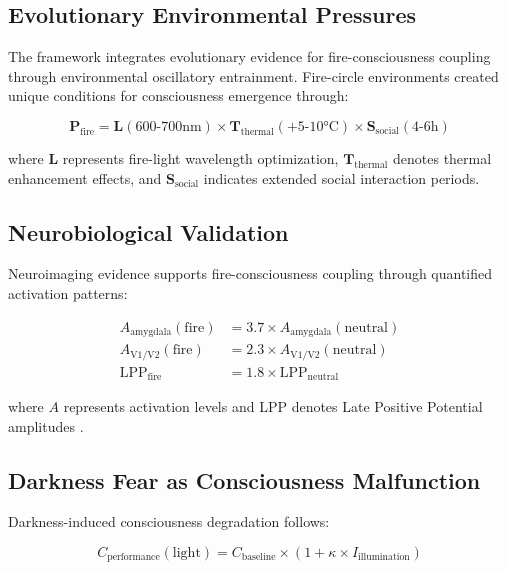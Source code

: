 \documentclass[12pt,a4paper]{article}
\begin{document}
\subsection{Evolutionary Environmental Pressures}

The framework integrates evolutionary evidence for fire-consciousness coupling through environmental oscillatory entrainment. Fire-circle environments created unique conditions for consciousness emergence through:

\begin{equation}
\mathbf{P}_{\text{fire}} = \mathbf{L}(600\text{-}700\text{nm}) \times \mathbf{T}_{\text{thermal}}(+5\text{-}10°\text{C}) \times \mathbf{S}_{\text{social}}(4\text{-}6\text{h})
\end{equation}

where $\mathbf{L}$ represents fire-light wavelength optimization, $\mathbf{T}_{\text{thermal}}$ denotes thermal enhancement effects, and $\mathbf{S}_{\text{social}}$ indicates extended social interaction periods.

\subsection{Neurobiological Validation}

Neuroimaging evidence supports fire-consciousness coupling through quantified activation patterns:

\begin{align}
A_{\text{amygdala}}(\text{fire}) &= 3.7 \times A_{\text{amygdala}}(\text{neutral}) \\
A_{\text{V1/V2}}(\text{fire}) &= 2.3 \times A_{\text{V1/V2}}(\text{neutral}) \\
\text{LPP}_{\text{fire}} &= 1.8 \times \text{LPP}_{\text{neutral}}
\end{align}

where $A$ represents activation levels and LPP denotes Late Positive Potential amplitudes \citep{morris1998conscious, sabatinelli2005affective, delplanque2004modulation}.

\subsection{Darkness Fear as Consciousness Malfunction}

Darkness-induced consciousness degradation follows:

\begin{equation}
C_{\text{performance}}(\text{light}) = C_{\text{baseline}} \times (1 + \kappa \times I_{\text{illumination}})
\end{equation}
\end{document}
